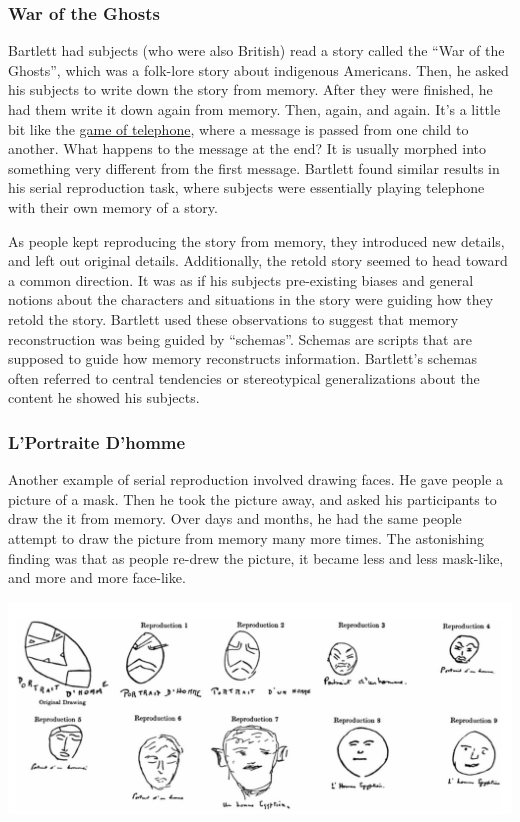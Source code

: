 \documentclass[
  oneside,
  12pt]{crumpbook}
\begin{document}
\hypertarget{war-of-the-ghosts}{%
\subsubsection{War of the Ghosts}\label{war-of-the-ghosts}}

Bartlett had subjects (who were also British) read a story called the ``War of the Ghosts'', which was a folk-lore story about indigenous Americans. Then, he asked his subjects to write down the story from memory. After they were finished, he had them write it down again from memory. Then, again, and again. It's a little bit like the \href{https://en.wikipedia.org/wiki/Chinese_whispers}{game of telephone}, where a message is passed from one child to another. What happens to the message at the end? It is usually morphed into something very different from the first message. Bartlett found similar results in his serial reproduction task, where subjects were essentially playing telephone with their own memory of a story.

As people kept reproducing the story from memory, they introduced new details, and left out original details. Additionally, the retold story seemed to head toward a common direction. It was as if his subjects pre-existing biases and general notions about the characters and situations in the story were guiding how they retold the story. Bartlett used these observations to suggest that memory reconstruction was being guided by ``schemas''. Schemas are scripts that are supposed to guide how memory reconstructs information. Bartlett's schemas often referred to central tendencies or stereotypical generalizations about the content he showed his subjects.

\hypertarget{lportraite-dhomme}{%
\subsubsection{L'Portraite D'homme}\label{lportraite-dhomme}}

Another example of serial reproduction involved drawing faces. He gave people a picture of a mask. Then he took the picture away, and asked his participants to draw the it from memory. Over days and months, he had the same people attempt to draw the picture from memory many more times. The astonishing finding was that as people re-drew the picture, it became less and less mask-like, and more and more face-like.

\begin{center}\includegraphics[width=1\linewidth]{imgs/Bartlett_homme} \end{center}
\end{document}
